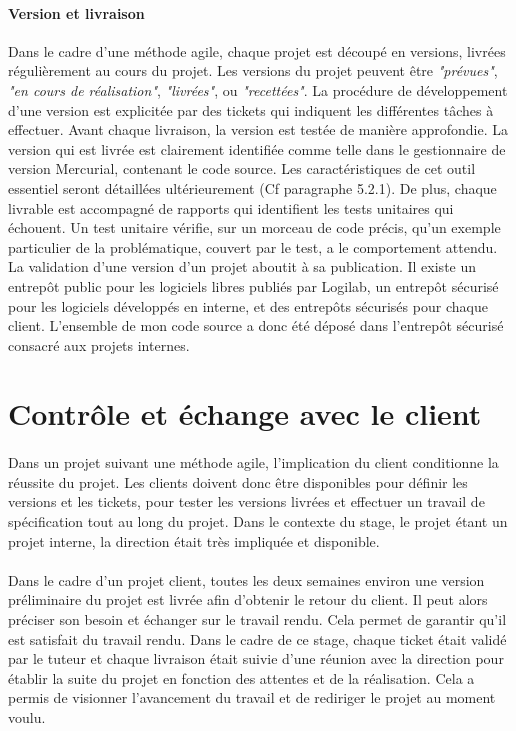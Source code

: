 \documentclass {report}
\begin{document}
\paragraph{Version et livraison}
Dans le cadre d'une méthode agile, chaque projet est découpé en versions, livrées régulièrement au cours du projet. Les versions du projet peuvent être \textit{"prévues"}, \textit{"en cours de réalisation"}, \textit{"livrées"}, ou \textit{"recettées"}. La procédure de développement d'une version est explicitée par des tickets qui indiquent les différentes tâches à effectuer. Avant chaque livraison, la version est testée de manière approfondie. La version qui est livrée est clairement identifiée comme telle dans le gestionnaire de version Mercurial, contenant le code source. Les caractéristiques de cet outil essentiel seront détaillées ultérieurement (Cf paragraphe 5.2.1). De plus, chaque livrable est accompagné de rapports qui identifient les tests unitaires qui échouent. Un test unitaire vérifie, sur un morceau de code précis, qu'un exemple particulier de la problématique, couvert par le test, a le comportement attendu. La validation d’une version d’un projet aboutit à sa publication. Il existe un entrepôt public pour les logiciels libres publiés par Logilab, un entrepôt sécurisé pour les logiciels développés en interne, et des entrepôts sécurisés pour chaque client. L'ensemble de mon code source a donc été déposé dans l'entrepôt sécurisé consacré aux projets internes.

\section{Contrôle et échange avec le client}
\paragraph{}
Dans un projet suivant une méthode agile, l'implication du client conditionne la réussite du projet. Les clients doivent donc être disponibles pour définir les versions et les tickets, pour tester les versions livrées et effectuer un travail de spécification tout au long du projet. Dans le contexte du stage, le projet étant un projet interne, la direction était très impliquée et disponible.
\paragraph{}
Dans le cadre d'un projet client, toutes les deux semaines environ une version préliminaire du projet est livrée afin d'obtenir le retour du client. Il peut alors préciser son besoin et échanger sur le travail rendu. Cela permet de garantir qu'il est satisfait du travail rendu. Dans le cadre de ce stage, chaque ticket était validé par le tuteur et chaque livraison était suivie d'une réunion avec la direction pour établir la suite du projet en fonction des attentes et de la réalisation. Cela a permis de visionner l'avancement du travail et de rediriger le projet au moment voulu.
\end{document}

